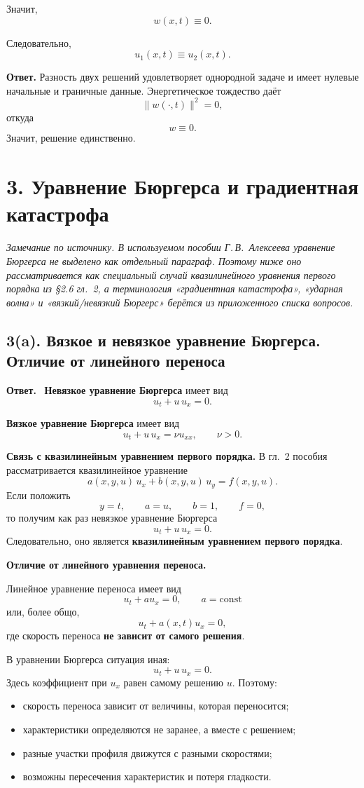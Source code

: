\documentclass[a4paper,12pt]{article}
\newcommand{\Answer}{\textbf{Ответ.}\ }
\begin{document}
Значит,
\[
w(x,t)\equiv 0.
\]

Следовательно,
\[
u_1(x,t)\equiv u_2(x,t).
\]

\textbf{Ответ.}
Разность двух решений удовлетворяет однородной задаче и имеет нулевые начальные и граничные данные. Энергетическое тождество даёт
\[
\|w(\cdot,t)\|^2=0,
\]
откуда
\[
w\equiv 0.
\]
Значит, решение единственно.

\section*{3. Уравнение Бюргерса и градиентная катастрофа}

\textit{Замечание по источнику. В используемом пособии Г.\,В.~Алексеева уравнение Бюргерса не выделено как отдельный параграф. Поэтому ниже оно рассматривается как специальный случай квазилинейного уравнения первого порядка из \S 2.6 гл.~2, а терминология «градиентная катастрофа», «ударная волна» и «вязкий/невязкий Бюргерс» берётся из приложенного списка вопросов.}

\subsection*{3(a). Вязкое и невязкое уравнение Бюргерса. Отличие от линейного переноса}

\Answer
\textbf{Невязкое уравнение Бюргерса} имеет вид
\[
u_t+u\,u_x=0.
\]

\textbf{Вязкое уравнение Бюргерса} имеет вид
\[
u_t+u\,u_x=\nu u_{xx},
\qquad \nu>0.
\]

\textbf{Связь с квазилинейным уравнением первого порядка.}
В гл.~2 пособия рассматривается квазилинейное уравнение
\[
a(x,y,u)\,u_x+b(x,y,u)\,u_y=f(x,y,u).
\]
Если положить
\[
y=t,\qquad a=u,\qquad b=1,\qquad f=0,
\]
то получим как раз невязкое уравнение Бюргерса
\[
u_t+u\,u_x=0.
\]
Следовательно, оно является \textbf{квазилинейным уравнением первого порядка}.

\textbf{Отличие от линейного уравнения переноса.}

Линейное уравнение переноса имеет вид
\[
u_t+a u_x=0,
\qquad a=\mathrm{const}
\]
или, более общо,
\[
u_t+a(x,t)u_x=0,
\]
где скорость переноса \textbf{не зависит от самого решения}.

В уравнении Бюргерса ситуация иная:
\[
u_t+u\,u_x=0.
\]
Здесь коэффициент при $u_x$ равен самому решению $u$. Поэтому:
\begin{itemize}
  \item скорость переноса зависит от величины, которая переносится;
  \item характеристики определяются не заранее, а вместе с решением;
  \item разные участки профиля движутся с разными скоростями;
  \item возможны пересечения характеристик и потеря гладкости.
\end{itemize}
\end{document}
